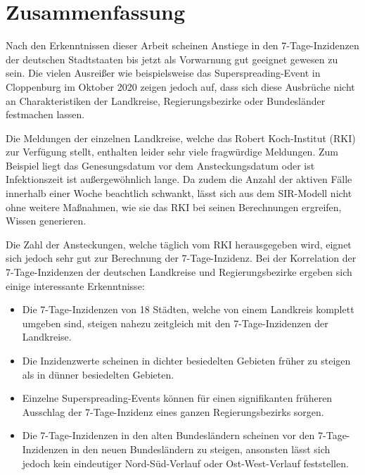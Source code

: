 \chapter{Zusammenfassung}\label{chap:Zusammenfassun}
Nach den Erkenntnissen dieser Arbeit scheinen Anstiege in den 7-Tage-Inzidenzen der deutschen Stadtstaaten bis jetzt als Vorwarnung gut geeignet gewesen zu sein. Die vielen Ausreißer wie beispielsweise das Superspreading-Event in Cloppenburg im Oktober 2020 zeigen jedoch auf, dass sich diese Ausbrüche nicht an Charakteristiken der Landkreise, Regierungsbezirke oder Bundesländer festmachen lassen.

Die Meldungen der einzelnen Landkreise, welche das Robert Koch-Institut (RKI) zur Verfügung stellt, enthalten leider sehr viele fragwürdige Meldungen. Zum Beispiel liegt das Genesungsdatum vor dem Ansteckungsdatum oder ist Infektionszeit ist außergewöhnlich lange. Da zudem die Anzahl der aktiven Fälle innerhalb einer Woche beachtlich schwankt, lässt sich aus dem SIR-Modell nicht ohne weitere Maßnahmen, wie sie das RKI bei seinen Berechnungen ergreifen, Wissen generieren.

\newpage
Die Zahl der Ansteckungen, welche täglich vom RKI herausgegeben wird, eignet sich jedoch sehr gut zur Berechnung der 7-Tage-Inzidenz.
Bei der Korrelation der 7-Tage-Inzidenzen der deutschen Landkreise und Regierungsbezirke ergeben sich einige interessante Erkenntnisse:
\begin{itemize}
    \item Die 7-Tage-Inzidenzen von 18 Städten, welche von einem Landkreis komplett umgeben sind, steigen nahezu zeitgleich mit den 7-Tage-Inzidenzen der Landkreise.
    \item Die Inzidenzwerte scheinen in dichter besiedelten Gebieten früher zu steigen als in dünner besiedelten Gebieten.
    \item Einzelne Superspreading-Events können für einen signifikanten früheren Ausschlag der 7-Tage-Inzidenz eines ganzen Regierungsbezirks sorgen.
    \item Die 7-Tage-Inzidenzen in den alten Bundesländern scheinen vor den 7-Tage-Inzidenzen in den neuen Bundesländern zu steigen, ansonsten lässt sich jedoch kein eindeutiger Nord-Süd-Verlauf oder Ost-West-Verlauf feststellen.
\end{itemize}